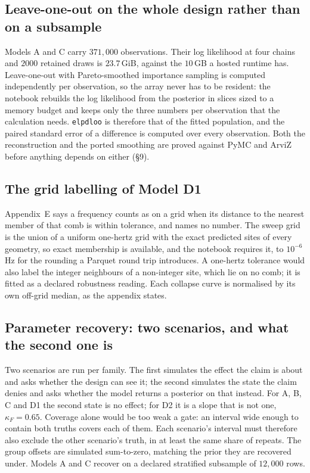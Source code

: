 \documentclass[10pt,a4paper]{article}
\newcommand{\code}[1]{\texttt{\UseBreakableUnderscores #1}}
\newcommand{\UseBreakableUnderscores}{\def\_{\textunderscore\allowbreak}}
\begin{document}
\subsection{Leave-one-out on the whole design rather than on a subsample}
Models A and C carry $371{,}000$ observations. Their log likelihood at four chains and $2000$ retained draws is $23.7$\,GiB, against the $10$\,GB a hosted runtime has. Leave-one-out with Pareto-smoothed importance sampling is computed independently per observation, so the array never has to be resident: the notebook rebuilds the log likelihood from the posterior in slices sized to a memory budget and keeps only the three numbers per observation that the calculation needs. \code{elpd\_loo} is therefore that of the fitted population, and the paired standard error of a difference is computed over every observation. Both the reconstruction and the ported smoothing are proved against PyMC and ArviZ before anything depends on either (§9).

\subsection{The grid labelling of Model D1}
Appendix~E says a frequency counts as on a grid when its distance to the nearest member of that comb is within tolerance, and names no number. The sweep grid is the union of a uniform one-hertz grid with the exact predicted sites of every geometry, so exact membership is available, and the notebook requires it, to $10^{-6}$\,Hz for the rounding a Parquet round trip introduces. A one-hertz tolerance would also label the integer neighbours of a non-integer site, which lie on no comb; it is fitted as a declared robustness reading. Each collapse curve is normalised by its own off-grid median, as the appendix states.

\subsection{Parameter recovery: two scenarios, and what the second one is}
Two scenarios are run per family. The first simulates the effect the claim is about and asks whether the design can see it; the second simulates the state the claim denies and asks whether the model returns a posterior on that instead. For A, B, C and D1 the second state is no effect; for D2 it is a slope that is not one, $\kappa_F=0.65$. Coverage alone would be too weak a gate: an interval wide enough to contain both truths covers each of them. Each scenario's interval must therefore also exclude the other scenario's truth, in at least the same share of repeats. The group offsets are simulated sum-to-zero, matching the prior they are recovered under. Models A and C recover on a declared stratified subsample of $12{,}000$ rows.
\end{document}
